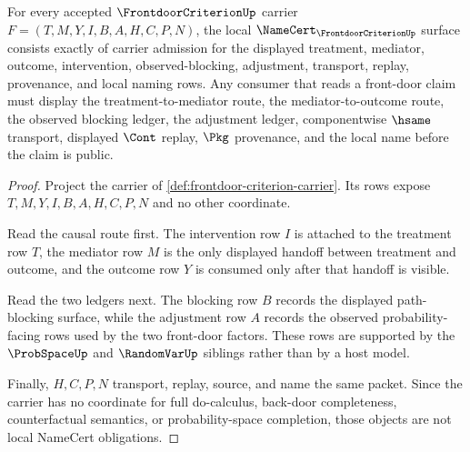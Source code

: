 \begin{theorem}
\label{thm:frontdoor-criterion-namecert-obligations}
For every accepted $\FrontdoorCriterionUp$ carrier $F=(T,M,Y,I,B,A,H,C,P,N)$, the local $\NameCert_{\FrontdoorCriterionUp}$ surface consists exactly of carrier admission for the displayed treatment, mediator, outcome, intervention, observed-blocking, adjustment, transport, replay, provenance, and local naming rows. Any consumer that reads a front-door claim must display the treatment-to-mediator route, the mediator-to-outcome route, the observed blocking ledger, the adjustment ledger, componentwise $\hsame$ transport, displayed $\Cont$ replay, $\Pkg$ provenance, and the local name before the claim is public.
\end{theorem}
\begin{proof}
Project the carrier of \autoref{def:frontdoor-criterion-carrier}. Its rows expose $T,M,Y,I,B,A,H,C,P,N$ and no other coordinate.

Read the causal route first. The intervention row $I$ is attached to the treatment row $T$, the mediator row $M$ is the only displayed handoff between treatment and outcome, and the outcome row $Y$ is consumed only after that handoff is visible.

Read the two ledgers next. The blocking row $B$ records the displayed path-blocking surface, while the adjustment row $A$ records the observed probability-facing rows used by the two front-door factors. These rows are supported by the $\ProbSpaceUp$ and $\RandomVarUp$ siblings rather than by a host model.

Finally, $H,C,P,N$ transport, replay, source, and name the same packet. Since the carrier has no coordinate for full do-calculus, back-door completeness, counterfactual semantics, or probability-space completion, those objects are not local NameCert obligations.
\end{proof}

